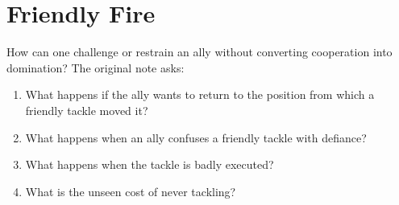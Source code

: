 \chapter{Friendly Fire}
\label{chap:friendly-fire}


How can one challenge or restrain an ally without converting cooperation into
domination? The original note asks:

\begin{enumerate}
  \item What happens if the ally wants to return to the position from which a
  friendly tackle moved it?
  \item What happens when an ally confuses a friendly tackle with defiance?
  \item What happens when the tackle is badly executed?
  \item What is the unseen cost of never tackling?
\end{enumerate}

